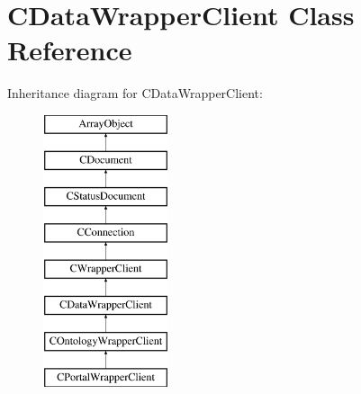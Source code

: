 \hypertarget{class_c_data_wrapper_client}{\section{C\-Data\-Wrapper\-Client Class Reference}
\label{class_c_data_wrapper_client}
}
Inheritance diagram for C\-Data\-Wrapper\-Client\-:\begin{figure}[H]
\begin{center}
\leavevmode
\includegraphics[height=8.000000cm]{class_c_data_wrapper_client}
\end{center}
\end{figure}
